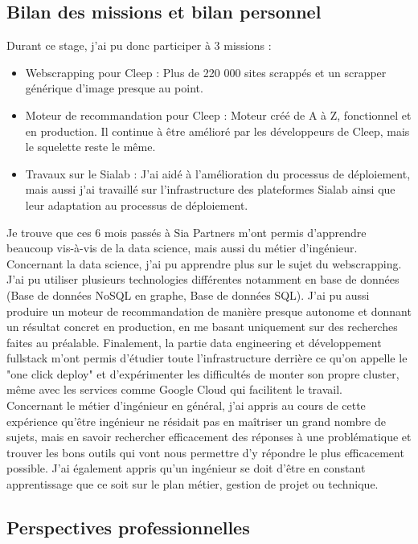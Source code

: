\documentclass{article} %
\begin{document}
\subsection{Bilan des missions et bilan personnel}
Durant ce stage, j'ai pu donc participer à 3 missions :
\begin{itemize}
 \item Webscrapping pour Cleep : Plus de 220 000 sites scrappés et un scrapper générique d'image presque au point.
 \item Moteur de recommandation pour Cleep : Moteur créé de A à Z, fonctionnel et en production. Il continue à être amélioré par les développeurs de Cleep, mais le squelette reste le même. 
 \item Travaux sur le Sialab : J'ai aidé à l'amélioration du processus de déploiement, mais aussi j'ai travaillé sur l'infrastructure des plateformes Sialab ainsi que leur adaptation au processus de déploiement.
\end{itemize}

Je trouve que ces 6 mois passés à Sia Partners m'ont permis d'apprendre beaucoup vis-à-vis de la data science, mais aussi du métier d'ingénieur. Concernant la data science, j'ai pu apprendre plus sur le sujet du webscrapping. J'ai pu utiliser plusieurs technologies différentes notamment en base de données (Base de données NoSQL en graphe, Base de données SQL). J'ai pu aussi produire un moteur de recommandation de manière presque autonome et donnant un résultat concret en production, en me basant uniquement sur des recherches faites au préalable. Finalement, la partie data engineering et développement  fullstack m'ont permis d'étudier toute l'infrastructure derrière ce qu'on appelle le "one click deploy" et d'expérimenter les difficultés de monter son propre cluster, même avec les services comme Google Cloud qui facilitent le travail.\\

Concernant le métier d’ingénieur en général, j’ai appris au cours de cette
expérience qu’être ingénieur ne résidait pas en maîtriser un grand nombre de sujets,
mais en savoir rechercher efficacement des réponses à une problématique et trouver
les bons outils qui vont nous permettre d’y répondre le plus efficacement possible. J’ai
également appris qu’un ingénieur se doit d’être en constant apprentissage que ce
soit sur le plan métier, gestion de projet ou technique.

\subsection{Perspectives professionnelles}
\end{document}
